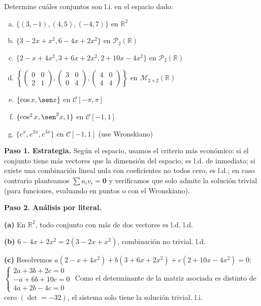 \begin{prob} Determine cuáles conjuntos son l.i. en el espacio dado:
\begin{enumerate}[(a)]
\item $\{(3,-1), (4,5), (-4,7)\}$ en $\mathbb{R}^2$
\item $\{3-2x+x^2, 6-4x+2x^2\}$ en $\mathcal{P}_2(\mathbb{R})$
\item $\{2-x+4x^2, 3+6x+2x^2, 2+10x-4x^2\}$ en $\mathcal{P}_2(\mathbb{R})$
\item $\left\{ \begin{pmatrix} 0 & 0 \\ 2 & 1 \end{pmatrix}, \begin{pmatrix} 3 & 0 \\ 0 & 4 \end{pmatrix}, \begin{pmatrix} 4 & 0 \\ 4 & 4 \end{pmatrix} \right\}$ en $\mathcal{M}_{2\times 2}(\mathbb{R})$
\item $\{\cos x, \sen x\}$ en $\mathcal{C}[-\pi, \pi]$
\item $\{\cos^2 x, \sen^2 x, 1\}$ en $\mathcal{C}[-1, 1]$
\item $\{e^x, e^{2x}, e^{3x}\}$ en $\mathcal{C}[-1, 1]$ (use Wronskiano)
\end{enumerate}

\begin{myproof}
\textbf{Paso 1. Estrategia.} Según el espacio, usamos el criterio más económico: si el conjunto tiene más vectores que la dimensión del espacio, es l.d. de inmediato; si existe una combinación lineal nula con coeficientes no todos cero, es l.d.; en caso contrario planteamos $\sum a_i v_i = \mathbf{0}$ y verificamos que solo admite la solución trivial (para funciones, evaluando en puntos o con el Wronskiano).

\textbf{Paso 2. Análisis por literal.}

\textbf{(a)} En $\mathbb{R}^2$, todo conjunto con más de dos vectores es l.d. $\boxed{\text{l.d.}}$

\textbf{(b)} $6-4x+2x^2 = 2(3-2x+x^2)$, combinación no trivial. $\boxed{\text{l.d.}}$

\textbf{(c)} Resolvemos $a(2-x+4x^2) + b(3+6x+2x^2) + c(2+10x-4x^2) = 0$: $\begin{cases} 2a + 3b + 2c = 0 \\ -a + 6b + 10c = 0 \\ 4a + 2b - 4c = 0 \end{cases}$ Como el determinante de la matriz asociada es distinto de cero $(\det = -32 )$, el sistema solo tiene la solución trivial. $\boxed{\text{l.i.}}$


\end{myproof}
\end{prob}
